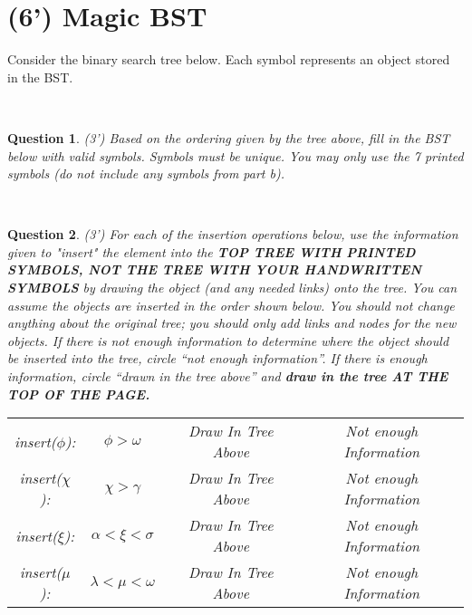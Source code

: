 \documentclass{article}
\newtheorem{Q}{Question}
\begin{document}
\section{(6') Magic BST}
Consider the binary search tree below. Each symbol represents an object stored in the BST. \\
\begin{minipage}{1\textwidth}
	\centering
\end{minipage} \\
\begin{Q} (3') Based on the ordering given by the tree above, fill in the BST below with valid symbols. Symbols
must be unique. You may only use the 7 printed symbols (do not include any symbols from part b).
\begin{minipage}{1\textwidth}
	\centering
\end{minipage} \\
\end{Q}
\begin{Q} (3') For each of the insertion operations below, use the information given to "insert" the element into the
\textbf{TOP TREE WITH PRINTED SYMBOLS, NOT THE TREE WITH YOUR HANDWRITTEN 
SYMBOLS} by drawing the object (and any needed links) onto the tree. You can assume the objects are
inserted in the order shown below. You should not change anything about the original tree; you should
only add links and nodes for the new objects. If there is not enough information to determine where the
object should be inserted into the tree, circle “not enough information”. If there is enough information,
circle “drawn in the tree above” and \textbf{draw in the tree AT THE TOP OF THE PAGE.}

\begin{table}[htbp]
	\centering
	\begin{tabular}{cccc}
		insert($\phi$): & $\phi>\omega$ & Draw In Tree Above & Not enough Information \\ 
		insert($\chi$): & $\chi>\gamma$&  Draw In Tree Above & Not enough Information \\
		insert($\xi$): & $\alpha<\xi<\sigma$&  Draw In Tree Above & Not enough Information \\
		insert($\mu$): & $\lambda<\mu<\omega$&  Draw In Tree Above & Not enough Information \\
	\end{tabular} 
\end{table}
\end{Q}
\end{document}
